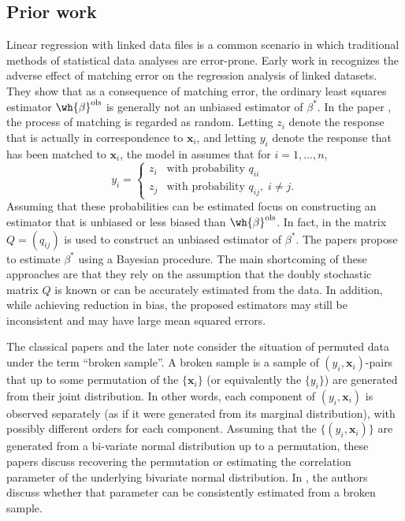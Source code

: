 \documentclass[11pt]{article}
\def\x{\mathbf{x}}
\begin{document}
\subsection{Prior work}
Linear regression with linked data files is a common scenario in which traditional methods of statistical data analyses are error-prone. Early work in \cite{Neter65} recognizes the adverse effect of matching error on the regression analysis of linked datasets. They show that as a consequence of matching error, the ordinary least squares estimator $\wh{\beta}^{\text{ols}}$ is generally not an unbiased estimator of $\beta^*$. In the paper \cite{Neter65}, the process of matching  
is regarded as random. Letting $z_i$ denote the response that is actually in correspondence to $\x_i$, and letting $y_i$ denote
the response that has been matched to $\x_i$, the model in \cite{Neter65} assumes that for $i=1,\ldots,n$,  
 \begin{equation}\label{eq:yz}
 y_i=\begin{cases}
 	z_i&\text{with probability $q_{ii}$}\\
 	z_j&\text{with probability $q_{ij}, \; i \neq j$}.
 \end{cases}
 \end{equation}   
 Assuming that these probabilities can be estimated \cite{Neter65, Scheuren93, Scheuren97, Lahiri05, Kim12} focus on  constructing an estimator that is unbiased or less biased than $\wh{\beta}^{\text{ols}}$. In fact, in \cite{Lahiri05} the matrix $Q=(q_{ij})$ is used to construct an unbiased estimator of $\beta^*$. The papers \cite{Hof12, Gutman13, Tancredi15} propose to estimate $\beta^*$ using a Bayesian procedure. The main shortcoming of these approaches are that they rely on the assumption that the doubly stochastic matrix $Q$ is known or can be accurately estimated from the data. In addition,  while achieving reduction in bias, the proposed estimators may still be inconsistent and may have large mean squared errors. 

The classical papers \cite{DeGroot1971, DeGroot1976, DeGroot1980} and the later note \cite{Wu1998} consider the situation of permuted data under the term ``broken sample''. A broken sample is a sample of $(y_i, \x_i)$-pairs that up to some permutation of the $\{\x_i\}$ (or equivalently the $\{ y_i \}$) are generated from their joint distribution. In other words, each component of $(y_i, \x_i)$ is observed separately (as if it were generated from its marginal distribution), with possibly different orders for each component. Assuming that the $\{(y_i, \x_i)\}$ are generated from a bi-variate normal distribution up to a permutation, these papers discuss recovering the permutation or estimating the correlation parameter of the underlying bivariate normal distribution. In \cite{Bai05, Chan2001}, the authors discuss whether that parameter can be consistently estimated from a broken sample.
\end{document}
